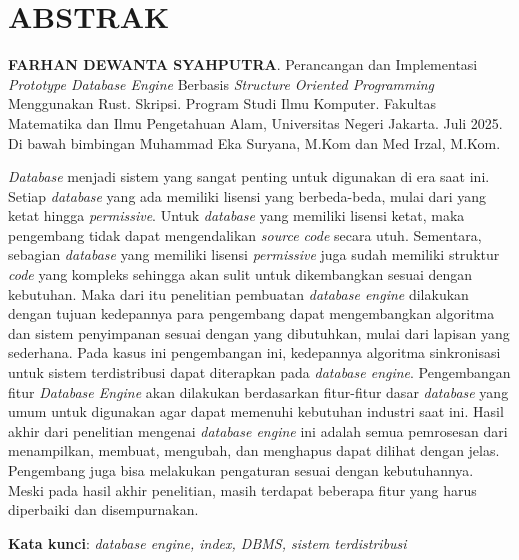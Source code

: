\chapter*{\textbf{ABSTRAK}}

\textbf{FARHAN DEWANTA SYAHPUTRA}. Perancangan dan Implementasi \emph{Prototype Database Engine} Berbasis 
\emph{Structure Oriented Programming} Menggunakan Rust. Skripsi. Program Studi Ilmu Komputer. Fakultas Matematika
dan Ilmu Pengetahuan Alam, Universitas Negeri Jakarta. Juli 2025. Di bawah bimbingan
Muhammad Eka Suryana, M.Kom dan Med Irzal, M.Kom. 


\vspace{5mm}
\noindent{}
\emph{Database} menjadi sistem yang sangat penting untuk digunakan di era saat ini.
Setiap \emph{database} yang ada memiliki lisensi yang berbeda-beda, mulai dari yang ketat hingga
\emph{permissive}. Untuk \emph{database} yang memiliki lisensi ketat, maka pengembang tidak dapat
mengendalikan \emph{source code} secara utuh. Sementara, sebagian \emph{database} yang memiliki lisensi \emph{permissive}
juga sudah memiliki struktur \emph{code} yang kompleks sehingga akan sulit untuk dikembangkan sesuai dengan kebutuhan.
Maka dari itu penelitian pembuatan \emph{database engine} dilakukan dengan tujuan kedepannya para pengembang dapat 
mengembangkan algoritma dan sistem penyimpanan sesuai dengan yang dibutuhkan, mulai dari lapisan yang sederhana. 
Pada kasus ini pengembangan ini, kedepannya algoritma sinkronisasi untuk sistem terdistribusi dapat diterapkan 
pada \emph{database engine}. Pengembangan fitur \emph{Database Engine} akan dilakukan berdasarkan fitur-fitur dasar \emph{database} yang umum untuk digunakan
agar dapat memenuhi kebutuhan industri saat ini. Hasil akhir dari penelitian mengenai \emph{database engine} ini adalah 
semua pemrosesan dari menampilkan, membuat, mengubah, dan menghapus dapat dilihat dengan jelas. Pengembang
juga bisa melakukan pengaturan sesuai dengan kebutuhannya. Meski pada hasil akhir penelitian,
masih terdapat beberapa fitur yang harus diperbaiki dan disempurnakan.

\vspace{5mm}
\noindent{}
\textbf{Kata kunci}: \emph{database engine, index, DBMS, sistem terdistribusi}
